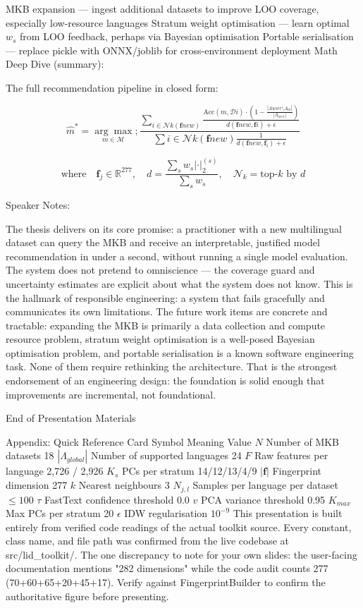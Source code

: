MKB expansion — ingest additional datasets to improve LOO coverage, especially low-resource languages
Stratum weight optimisation — learn optimal ${w_s}$ from LOO feedback, perhaps via Bayesian optimisation
Portable serialisation — replace pickle with ONNX/joblib for cross-environment deployment
Math Deep Dive (summary):

The full recommendation pipeline in closed form:

$$\hat{m}^* = \underset{m \in \mathcal{M}}{\arg\max}; \frac{\displaystyle\sum_{i \in \mathcal{N}k(\mathbf{f}{new})} \frac{\text{Acc}(m, \mathcal{D}i) \cdot \left(1 - \frac{|\Lambda{user} \setminus \Lambda_m|}{|\Lambda_{user}|}\right)}{d(\mathbf{f}{new}, \mathbf{f}i) + \epsilon}}{\displaystyle\sum{i \in \mathcal{N}k(\mathbf{f}{new})} \frac{1}{d(\mathbf{f}{new}, \mathbf{f}_i) + \epsilon}}$$

$$\text{where}\quad \mathbf{f}_j \in \mathbb{R}^{277}, \quad d = \frac{\sum_s w_s |\cdot|_2^{(s)}}{\sum_s w_s}, \quad \mathcal{N}_k = \text{top-}k\text{ by }d$$

Speaker Notes:

The thesis delivers on its core promise: a practitioner with a new multilingual dataset can query the MKB and receive an interpretable, justified model recommendation in under a second, without running a single model evaluation. The system does not pretend to omniscience — the coverage guard and uncertainty estimates are explicit about what the system does not know. This is the hallmark of responsible engineering: a system that fails gracefully and communicates its own limitations. The future work items are concrete and tractable: expanding the MKB is primarily a data collection and compute resource problem, stratum weight optimisation is a well-posed Bayesian optimisation problem, and portable serialisation is a known software engineering task. None of them require rethinking the architecture. That is the strongest endorsement of an engineering design: the foundation is solid enough that improvements are incremental, not foundational.

End of Presentation Materials

Appendix: Quick Reference Card
Symbol	Meaning	Value
$N$	Number of MKB datasets	18
$|\Lambda_{global}|$	Number of supported languages	24
$F$	Raw features per language	2,726 / 2,926
$K_s$	PCs per stratum	14/12/13/4/9
$|\mathbf{f}|$	Fingerprint dimension	277
$k$	Nearest neighbours	3
$N_{j,l}$	Samples per language per dataset	$\leq 100$
$\tau$	FastText confidence threshold	0.0
$v$	PCA variance threshold	0.95
$K_{max}$	Max PCs per stratum	20
$\epsilon$	IDW regularisation	$10^{-9}$
This presentation is built entirely from verified code readings of the actual toolkit source. Every constant, class name, and file path was confirmed from the live codebase at src/lid_toolkit/. The one discrepancy to note for your own slides: the user-facing documentation mentions "282 dimensions" while the code audit counts 277 (70+60+65+20+45+17). Verify against FingerprintBuilder to confirm the authoritative figure before presenting.